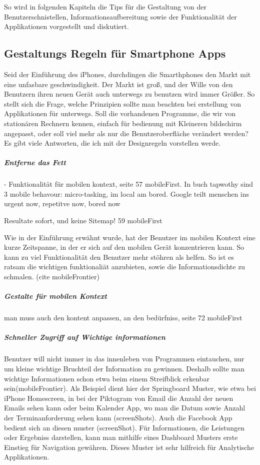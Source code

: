 So wird in folgenden Kapiteln die Tips für die Gestaltung von der Benutzerschnistellen, Informationsaufbereitung sowie der Funktionalität der Applikationen vorgestellt und diskutiert.


\subsection{Gestaltungs Regeln für Smartphone Apps}
\label{sub:design_f_r_mobile_ger_te}

Seid der Einführung des iPhones, durchdingen die Smarthphones den Markt mit eine unfasbare geschwindigkeit. Der Markt ist groß, und der Wille von den Benutzern ihren neuen Gerät auch unterwegs zu benutzen wird immer Größer. So stellt sich die Frage, welche Prinzipien sollte man beachten bei erstellung von Applikationen für unterwegs. Soll die vorhandenen Programme, die wir von stationären Rechnern kennen, einfach für bedienung mit Kleineren bildschirm angepasst, oder soll viel mehr als nur die Benutzeroberfläche verändert werden? Es gibt viele Antworten, die ich mit der Designregeln vorstellen werde.

\subparagraph{Entferne das Fett} 
\label{subp:entferne_das_fett}

- Funktionalität für mobilen kontext, seite 57 mobileFirst. In buch tapwothy sind 3 mobile behavour: micro-tasking, im local am bored. Google teilt menschen ins urgent now, repetitve now, bored now

Resultate sofort, und keine Sitemap! 59 mobileFirst

Wie in der Einführung erwähnt wurde, hat der Benutzer im mobilen Kontext eine kurze Zeitspanne, in der er sich auf den mobilen Gerät konzentrieren kann. So kann zu viel Funktionalität den Benutzer mehr stöhren als helfen. So ist es ratsam die wichtigen funktionaliät anzubieten, sowie die Informationsdichte zu schmalen. (cite mobileFrontier)

\subparagraph{Gestalte für mobilen Kontext}
\label{subp:gestalte_f_r_mobilen_kontext}

man muss auch den kontent anpassen, an den bedürfniss, seite 72 mobileFirst


\subparagraph{Schneller Zugriff auf Wichtige informationen} 
\label{subp:subparagraph_name}

Benutzer will nicht immer in das innenleben von Programmen eintauchen, nur um kleine wichtige Bruchteil der Information zu gewinnen. Deshalb sollte man wichtige Informationen schon etwa beim einem Streifblick erkenbar sein(mobileFrontier)\cite{Neil:2012uf}. Als Beispiel dient hier der Springboard Muster, wie etwa bei iPhone Homescreen, in bei der Piktogram von Email die Anzahl der neuen Emails sehen kann oder beim Kalender App, wo man die Datum sowie Anzahl der Terminanforderung sehen kann (screenShots). Auch die Facebook App bedient sich an diesen muster (screenShot). Für Informationen, die Leistungen oder Ergebniss darstellen, kann man mithilfe eines Dashboard Musters erste Einstieg für Navigation gewähren. Dieses Muster ist sehr hilfreich für Analytische Applikationen.

